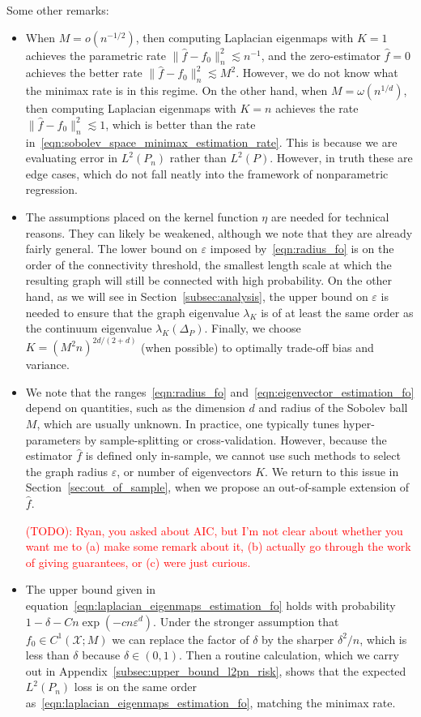 \documentclass{article}
\newcommand{\1}{\mathbf{1}}
\newcommand{\mc}[1]{\mathcal{#1}}
\newcommand{\wh}[1]{\widehat{#1}}
\theoremstyle{alden}
\theoremstyle{aldenthm}
\theoremstyle{definition}
\theoremstyle{remark}
\begin{document}
Some other remarks:
\begin{itemize}
	\item When $M = o(n^{-1/2})$, then computing Laplacian eigenmaps with $K = 1$ achieves the parametric rate $\|\wh{f} - f_0\|_n^2 \lesssim n^{-1}$, and the zero-estimator $\wh{f} = 0$ achieves the better rate $\|\wh{f} - f_0\|_n^2 \lesssim M^2$. However, we do not know what the minimax rate is in this regime. On the other hand, when $M = \omega(n^{1/d})$, then computing Laplacian eigenmaps with $K = n$ achieves the rate $\|\wh{f} - f_0\|_n^2 \lesssim 1$, which is better than the rate in~\eqref{eqn:sobolev_space_minimax_estimation_rate}. This is because we are evaluating error in $L^2(P_n)$ rather than $L^2(P)$. However, in truth these are edge cases, which do not fall neatly into the framework of nonparametric regression. 
	\item The assumptions placed on the kernel function $\eta$ are needed for technical reasons. They can likely be weakened, although we note that they are already fairly general. The lower bound on $\varepsilon$ imposed by~\eqref{eqn:radius_fo} is on the order of the connectivity threshold, the smallest length scale at which the resulting graph will still be connected with high probability. On the other hand, as we will see in Section~\ref{subsec:analysis}, the upper bound on $\varepsilon$ is needed to ensure that the graph eigenvalue $\lambda_K$ is of at least the same order as the continuum eigenvalue $\lambda_K(\Delta_P)$. Finally, we choose $K = (M^2n)^{2d/(2 + d)}$ (when possible) to optimally trade-off bias and variance.
	\item We note that the ranges~\eqref{eqn:radius_fo} and~\eqref{eqn:eigenvector_estimation_fo} depend on quantities, such as the dimension $d$ and radius of the Sobolev ball $M$, which are usually unknown. In practice, one typically tunes hyper-parameters by sample-splitting or cross-validation. However, because the estimator $\wh{f}$ is defined only in-sample, we cannot use such methods to select the graph radius $\varepsilon$, or number of eigenvectors $K$. We return to this issue in Section~\ref{sec:out_of_sample}, when we propose an out-of-sample extension of $\wh{f}$. 
	
	\textcolor{red}{(TODO): Ryan, you asked about AIC, but I'm not clear about whether you want me to (a) make some remark about it, (b) actually go through the work of giving guarantees, or (c) were just curious.}
	
	\item The upper bound given in equation~\eqref{eqn:laplacian_eigenmaps_estimation_fo} holds with probability $1 - \delta - Cn\exp(-cn\varepsilon^d)$. Under the stronger assumption that $f_0 \in C^1(\mc{X};M)$ we can replace the factor of $\delta$ by the sharper $\delta^2/n$, which is less than $\delta$ because $\delta \in (0,1)$. Then a routine calculation, which we carry out in Appendix~\ref{subsec:upper_bound_l2pn_risk}, shows that the expected $L^2(P_n)$ loss is on the same order as~\eqref{eqn:laplacian_eigenmaps_estimation_fo}, matching the minimax rate.
\end{itemize}
\end{document}
